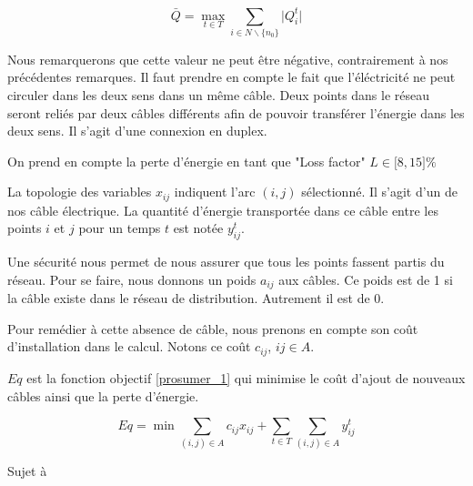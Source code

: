 \begin{equation*}
  \bar{Q} = \max_{t \in T} \sum_{i \in N \backslash \lbrace n_0 \rbrace} \lvert Q^t_i \rvert
\end{equation*}


Nous remarquerons que cette valeur ne peut être négative, contrairement à nos précédentes remarques.
Il faut prendre en compte le fait que l'éléctricité ne peut circuler dans les deux sens dans un même câble.
Deux points dans le réseau seront reliés par deux câbles différents afin de pouvoir transférer l'énergie dans les deux sens.
Il s'agit d'une connexion en duplex.

On prend en compte la perte d'énergie en tant que "Loss factor" $L \in \lbrack 8, 15 \rbrack \%$

La topologie des variables $x_{ij}$ indiquent l'arc $(i, j)$ sélectionné. Il s'agit d'un de nos câble électrique.
La quantité d'énergie transportée dans ce câble entre les points $i$ et $j$ pour un temps $t$ est notée $y^t_{ij}$.

Une sécurité nous permet de nous assurer que tous les points fassent partis du réseau.
Pour se faire, nous donnons un poids $a_{ij}$ aux câbles.
Ce poids est de 1 si la câble existe dans le réseau de distribution.
Autrement il est de 0.

Pour remédier à cette absence de câble, nous prenons en compte son coût d'installation dans le calcul.
Notons ce coût $c_{ij}$, $ij \in A$.

$Eq$ est la fonction objectif \ref{prosumer_1} qui minimise le coût d'ajout de nouveaux câbles
ainsi que la perte d'énergie.

\begin{equation} \label{prosumer_1}
  Eq = \min \sum_{(i, j) \in A} c_{ij} x_{ij} + \sum_{t \in T} \sum_{(i,j) \in A} y^t_{ij}
\end{equation}

Sujet à

